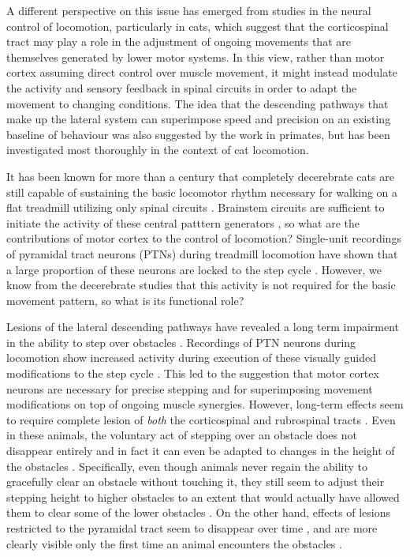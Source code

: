 A different perspective on this issue has emerged from studies in the neural control of locomotion, particularly in cats, which suggest that the corticospinal tract may play a role in the adjustment of ongoing movements that are themselves generated by lower motor systems. In this view, rather than motor cortex assuming direct control over muscle movement, it might instead modulate the activity and sensory feedback in spinal circuits in order to adapt the movement to changing conditions. The idea that the descending pathways that make up the lateral system can superimpose speed and precision on an existing baseline of behaviour was also suggested by the work in primates, but has been investigated most thoroughly in the context of cat locomotion.

It has been known for more than a century that completely decerebrate cats are still capable of sustaining the basic locomotor rhythm necessary for walking on a flat treadmill utilizing only spinal circuits \cite{GrahamBrown1911}. Brainstem circuits are sufficient to initiate the activity of these central patttern generators \cite{Grillner1973}, so what are the contributions of motor cortex to the control of locomotion? Single-unit recordings of pyramidal tract neurons (PTNs) during treadmill locomotion have shown that a large proportion of these neurons are locked to the step cycle \cite{Armstrong1984a}. However, we know from the decerebrate studies that this activity is not required for the basic movement pattern, so what is its functional role?

Lesions of the lateral descending pathways have revealed a long term impairment in the ability to step over obstacles \cite{Drew2002}. Recordings of PTN neurons during locomotion show increased activity during execution of these visually guided modifications to the step cycle \cite{Drew1996}. This led to the suggestion that motor cortex neurons are necessary for precise stepping and for superimposing movement modifications on top of ongoing muscle synergies. However, long-term effects seem to require complete lesion of \emph{both} the corticospinal and rubrospinal tracts \cite{Drew2002}. Even in these animals, the voluntary act of stepping over an obstacle does not disappear entirely and in fact it can even be adapted to changes in the height of the obstacles \cite{Drew2002}. Specifically, even though animals never regain the ability to gracefully clear an obstacle without touching it, they still seem to adjust their stepping height to higher obstacles to an extent that would actually have allowed them to clear some of the lower obstacles \cite{Drew2002}. On the other hand, effects of lesions restricted to the pyramidal tract seem to disappear over time \cite{Liddell1944}, and are more clearly visible only the first time an animal encounters the obstacles \cite{Liddell1944}.

